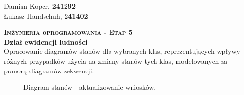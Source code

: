 \documentclass[12pt]{article}
\begin{document}
\begin{flushleft}
    Damian Koper, \textbf{241292} \\
    Łukasz Handschuh, \textbf{241402}
\end{flushleft}
\vspace{1cm}
{
\centering
{\Huge\scshape\bfseries Inżynieria oprogramowania - Etap 5 }\\
\vspace{0.25cm}
\Large\textbf{Dział ewidencji ludności} \\
\vspace{0.25cm}
\large Opracowanie diagramów stanów dla wybranych klas,
reprezentujących wpływy różnych przypadków użycia na
zmiany stanów tych klas, modelowanych za pomocą
diagramów sekwencji.\\
}

\begin{figure}[H]
    \centering
    \caption{Diagram stanów - aktualizowanie wniosków.}
    \label{}
\end{figure}
\clearpage
\end{document}
